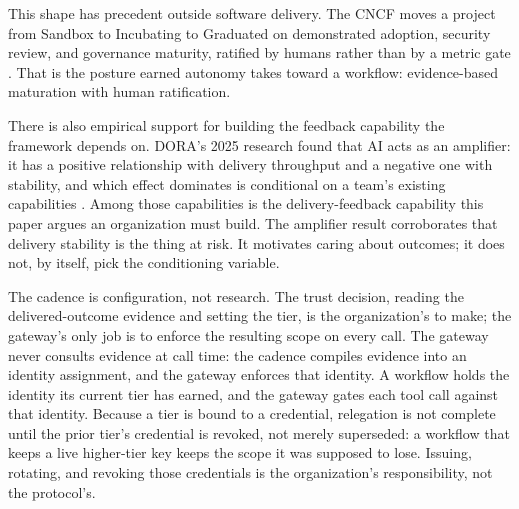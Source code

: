 This shape has precedent outside software delivery. The CNCF moves a project from
Sandbox to Incubating to Graduated on demonstrated adoption, security review, and
governance maturity, ratified by humans rather than by a metric gate
\citep{cncflifecycle}. That is the posture earned autonomy takes toward a
workflow: evidence-based maturation with human ratification.

There is also empirical support for building the feedback capability the
framework depends on. DORA's 2025 research found that AI acts as an amplifier: it
has a positive relationship with delivery throughput and a negative one with
stability, and which effect dominates is conditional on a team's existing
capabilities \citep{dora2025}. Among those capabilities is the delivery-feedback
capability this paper argues an organization must build. The amplifier result
corroborates that delivery stability is the thing at risk. It motivates caring
about outcomes; it does not, by itself, pick the conditioning variable.

The cadence is configuration, not research. The trust decision, reading the
delivered-outcome evidence and setting the tier, is the organization's to make;
the gateway's only job is to enforce the resulting scope on every call. The
gateway never consults evidence at call time: the cadence compiles evidence into
an identity assignment, and the gateway enforces that identity. A workflow holds
the identity its current tier has earned, and the gateway gates each tool call
against that identity. Because a tier is bound to a credential, relegation is not
complete until the prior tier's credential is revoked, not merely superseded: a
workflow that keeps a live higher-tier key keeps the scope it was supposed to
lose. Issuing, rotating, and revoking those credentials is the organization's
responsibility, not the protocol's.

